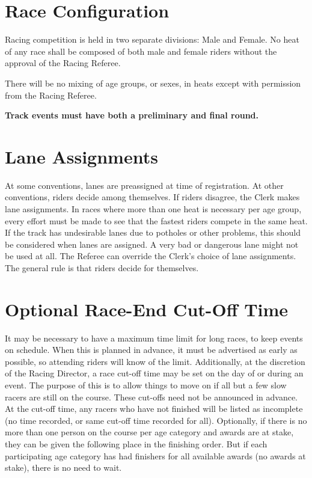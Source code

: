 \section{Race Configuration}

Racing competition is held in two separate divisions: Male and Female.
No heat of any race shall be composed of both male and female riders without the approval of the Racing Referee.

There will be no mixing of age groups, or sexes, in heats except with permission from the Racing Referee.

\textbf{Track events must have both a preliminary and final round.}

\section{Lane Assignments}

At some conventions, lanes are preassigned at time of registration.
At other conventions, riders decide among themselves.
If riders disagree, the Clerk makes lane assignments.
In races where more than one heat is necessary per age group, every effort must be made to see that the fastest riders compete in the same heat.
If the track has undesirable lanes due to potholes or other problems, this should be considered when lanes are assigned.
A very bad or dangerous lane might not be used at all.
The Referee can override the Clerk's choice of lane assignments.
The general rule is that riders decide for themselves.

\section{Optional Race-End Cut-Off Time}
It may be necessary to have a maximum time limit for long races, to keep events on schedule.
When this is planned in advance, it must be advertised as early as possible, so attending riders will know of the limit.
Additionally, at the discretion of the Racing Director, a race cut-off time may be set on the day of or during an event.
The purpose of this is to allow things to move on if all but a few slow racers are still on the course.
These cut-offs need not be announced in advance.
At the cut-off time, any racers who have not finished will be listed as incomplete (no time recorded, or same cut-off time recorded for all).
Optionally, if there is no more than one person on the course per age category and awards are at stake, they can be given the following place in the finishing order.
But if each participating age category has had finishers for all available awards (no awards at stake), there is no need to wait.
